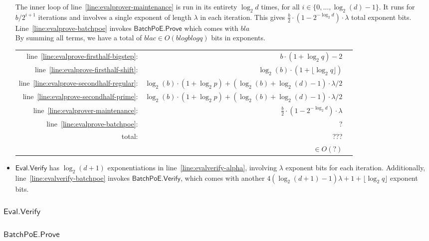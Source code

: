 \documentclass[11pt]{article}
\theoremstyle{Definition}
\begin{document}
\begin{itemize}
The inner loop of line~\ref{line:evalprover-maintenance} is run in its entirety $\log_2 d$ times, for all $i \in \{0, \ldots, \log_2(d)-1\}$. It runs for $b/2^{i+1}$ iterations and involves a single exponent of length $\lambda$ in each iteration. This gives $\frac{b}{2} \cdot (1 - 2^{-\log_2 d}) \cdot \lambda$ total exponent bits. \\
Line~\ref{line:evalprove-batchpoe} invokes $\mathsf{BatchPoE.Prove}$ which comes with $ bla$ \\
By summing all terms, we have a total of $blac \in O(b log b log q)$ bits in exponents. \\
\begin{center}
\begin{tabular}{rrl} \\
line~\ref{line:evalprove-firsthalf-bigstep}: & $b \cdot ( 1 + \log_2 q ) - 2$ \\
line~\ref{line:evalprove-firsthalf-shift}: & $\log_2(b) \cdot (1 + \lfloor \log_2 q \rfloor)$ \\
line~\ref{line:evalprove-secondhalf-regular}: & $\log_2(b) \cdot ( 1 + \log_2 p ) + (\log_2(b) + \log_2(d)-1) \cdot \lambda / 2$ \\
line~\ref{line:evalprove-secondhalf-prime}: & $\log_2(b) \cdot ( 1 + \log_2 p ) + (\log_2(b) + \log_2(d)-1) \cdot \lambda / 2$ \\
line~\ref{line:evalprover-maintenance}: & $\frac{b}{2} \cdot (1 - 2^{-\log_2 d}) \cdot \lambda$ \\
line~\ref{line:evalprove-batchpoe}: & ? \\ \hline
total: & ??? \\
 & $\in O(?)$ 
\end{tabular}
\end{center}
\item $\mathsf{Eval.Verify}$ has $\log_2(d+1)$ exponentiations in line~\ref{line:evalverify-alpha}, involving $\lambda$ exponent bits for each iteration. Additionally, line~\ref{line:evalverify-batchpoe} invokes $\mathsf{BatchPoE.Verify}$, which comes with another $4 (\log_2(d+1) - 1) \lambda + 1 + \lfloor \log_2 q \rfloor$ exponent bits.
\end{itemize}

\subsubsection{$\mathsf{Eval.Verify}$}
\subsubsection{$\mathsf{BatchPoE.Prove}$}
\end{document}
